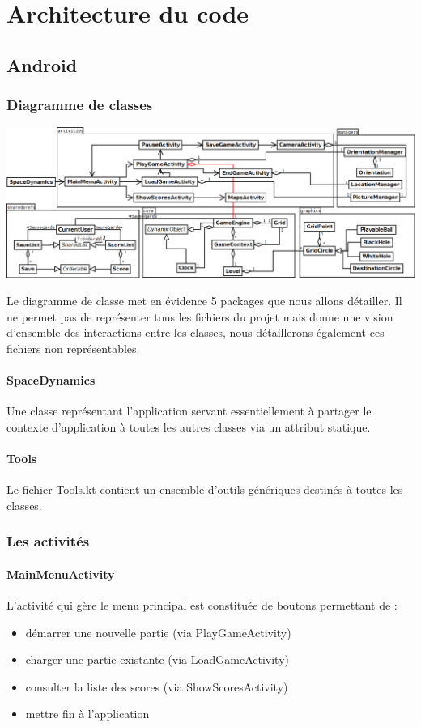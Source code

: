 \documentclass{article}
\begin{document}
\section{Architecture du code}

\subsection{Android}

\subsubsection{Diagramme de classes}
\begin{center}
\includegraphics[scale=0.25]{Diagram.png}
\end{center}
Le diagramme de classe met en évidence 5 packages que nous allons détailler. Il ne permet pas de représenter tous les fichiers du projet mais donne une vision d'ensemble des interactions entre les classes, nous détaillerons également ces fichiers non représentables.

\paragraph{SpaceDynamics}
Une classe représentant l'application servant essentiellement à partager le contexte d’application à toutes les autres classes via un attribut statique.

\paragraph{Tools}
Le fichier Tools.kt contient un ensemble d’outils génériques destinés à toutes les classes.

\subsubsection{Les activités}

\paragraph{MainMenuActivity}
L'activité qui gère le menu principal est constituée de boutons permettant de :
\begin{itemize}
\item démarrer une nouvelle partie (via PlayGameActivity)
\item charger une partie existante (via LoadGameActivity)
\item consulter la liste des scores (via ShowScoresActivity)
\item mettre fin à l'application
\end{itemize}
\end{document}
